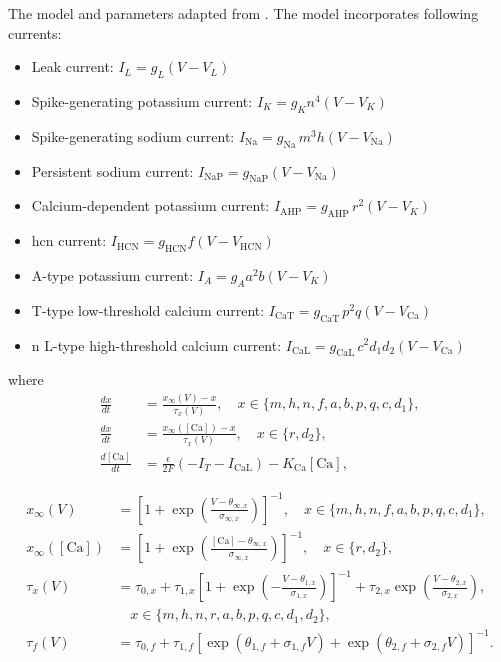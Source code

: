 \documentclass[../main.tex]{subfiles}
\begin{document}
The model and parameters adapted from \parencite{parkMathematicalModelSubthalamic2021}.
The model incorporates following currents:
\begin{itemize}
    \item Leak current: $I_L = g_L (V - V_L)$
    \item Spike-generating potassium current: $I_K = g_K n^4 (V - V_K)$
    \item Spike-generating sodium current: $I_{\text{Na}} = g_{\text{Na}} \, m^3 h (V - V_{\text{Na}})$
    \item Persistent sodium current: $I_{\text{NaP}} = g_{\text{NaP}} (V - V_{\text{Na}})$
    \item Calcium-dependent potassium current: $I_{\text{AHP}} = g_{\text{AHP}} \, r^2 (V - V_K)$
    \item \gls{hcn} current: $I_{\text{HCN}} = g_{\text{HCN}} f(V - V_{\text{HCN}})$
    \item A-type potassium current: $I_A = g_A a^2 b (V - V_K)$
    \item T-type low-threshold calcium current: $I_{\text{CaT}} = g_{\text{CaT}} \, p^2 q (V - V_{\text{Ca}})$
    \item n L-type high-threshold calcium current: $I_{\text{CaL}} = g_{\text{CaL}} \, c^2 d_1 d_2 (V - V_{\text{Ca}})$
\end{itemize}

where
\begin{align}
    \frac{dx}{dt} &= \frac{x_\infty(V) - x}{\tau_x(V)}, \quad x \in \{m, h, n, f, a, b, p, q, c, d_1\}, \tag{2} \\
    \frac{dx}{dt} &= \frac{x_\infty([\text{Ca}]) - x}{\tau_x(V)}, \quad x \in \{r, d_2\}, \tag{3} \\
    \frac{d[\text{Ca}]}{dt} &= \frac{\epsilon}{2F} (-I_T - I_{\text{CaL}}) - K_{\text{Ca}}[\text{Ca}], \tag{4}
\end{align}

\begin{align*}
    x_\infty(V) &= \left[ 1 + \exp\left(\frac{V - \theta_{\infty,x}}{\sigma_{\infty,x}}\right) \right]^{-1}, \quad x \in \{m, h, n, f, a, b, p, q, c, d_1\}, \\
    x_\infty([\mathrm{Ca}]) &= \left[ 1 + \exp\left( \frac{[\mathrm{Ca}] - \theta_{\infty,x}}{\sigma_{\infty,x}} \right) \right]^{-1}, \quad x \in \{r, d_2\}, \\
    \tau_x(V) &= \tau_{0,x} + \tau_{1,x} \left[ 1 + \exp\left( -\frac{V - \theta_{1,x}}{\sigma_{1,x}} \right) \right]^{-1} + \tau_{2,x} \exp\left( \frac{V - \theta_{2,x}}{\sigma_{2,x}} \right), \\
    &\quad x \in \{m, h, n, r, a, b, p, q, c, d_1, d_2\}, \\
    \tau_f(V) &= \tau_{0,f} + \tau_{1,f} \left[\exp(\theta_{1,f} + \sigma_{1,f} V) + \exp(\theta_{2,f} + \sigma_{2,f} V)\right]^{-1}.
\end{align*}
    
\end{document}
